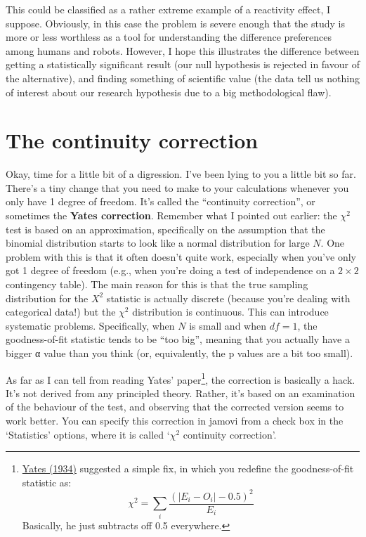 \documentclass[
  a4paper,
]{book}
\begin{document}
This could be classified as a rather extreme example of a reactivity
effect, I suppose. Obviously, in this case the problem is severe enough
that the study is more or less worthless as a tool for understanding the
difference preferences among humans and robots. However, I hope this
illustrates the difference between getting a statistically significant
result (our null hypothesis is rejected in favour of the alternative),
and finding something of scientific value (the data tell us nothing of
interest about our research hypothesis due to a big methodological
flaw).

\hypertarget{the-continuity-correction}{%
\section{The continuity correction}\label{the-continuity-correction}}

Okay, time for a little bit of a digression. I've been lying to you a
little bit so far. There's a tiny change that you need to make to your
calculations whenever you only have 1 degree of freedom. It's called the
``continuity correction'', or sometimes the \textbf{Yates correction}.
Remember what I pointed out earlier: the \(\chi^2\) test is based on an
approximation, specifically on the assumption that the binomial
distribution starts to look like a normal distribution for large \(N\).
One problem with this is that it often doesn't quite work, especially
when you've only got 1 degree of freedom (e.g., when you're doing a test
of independence on a \(2 \times 2\) contingency table). The main reason
for this is that the true sampling distribution for the \(X^{2}\)
statistic is actually discrete (because you're dealing with categorical
data!) but the \(\chi^2\) distribution is continuous. This can introduce
systematic problems. Specifically, when \(N\) is small and when
\(df = 1\), the goodness-of-fit statistic tends to be ``too big'',
meaning that you actually have a bigger α value than you think (or,
equivalently, the p values are a bit too small).

As far as I can tell from reading Yates' paper\footnote{\href{https://www.jstor.org/stable/2983604}{Yates
  (1934)} suggested a simple fix, in which you redefine the
  goodness-of-fit statistic as:
  \[\chi^{2}=\sum_{i}\frac{(|E_i-O_i|-0.5)^2}{E_i}\] Basically, he just
  subtracts off 0.5 everywhere.}, the correction is basically a hack.
It's not derived from any principled theory. Rather, it's based on an
examination of the behaviour of the test, and observing that the
corrected version seems to work better. You can specify this correction
in jamovi from a check box in the `Statistics' options, where it is
called `\(\chi^2\) continuity correction'.
\end{document}
